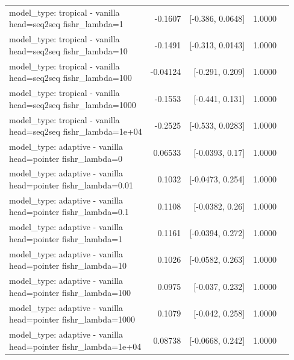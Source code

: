 \documentclass[10pt]{article}
\makeatletter
\newcommand{\stackcell}[1]{\begin{tabular}[t]{@{}l@{}}#1\end{tabular}}
\makeatother
\begin{document}
{\begin{longtable}{lrrrl}
\stackcell{model\_type: tropical - vanilla\\\footnotesize head=seq2seq fishr\_lambda=1 } & -0.1607 & [-0.386, 0.0648] & 1.0000 & \\
\stackcell{model\_type: tropical - vanilla\\\footnotesize head=seq2seq fishr\_lambda=10 } & -0.1491 & [-0.313, 0.0143] & 1.0000 & \\
\stackcell{model\_type: tropical - vanilla\\\footnotesize head=seq2seq fishr\_lambda=100 } & -0.04124 & [-0.291, 0.209] & 1.0000 & \\
\stackcell{model\_type: tropical - vanilla\\\footnotesize head=seq2seq fishr\_lambda=1000 } & -0.1553 & [-0.441, 0.131] & 1.0000 & \\
\stackcell{model\_type: tropical - vanilla\\\footnotesize head=seq2seq fishr\_lambda=1e+04 } & -0.2525 & [-0.533, 0.0283] & 1.0000 & \\
\stackcell{model\_type: adaptive - vanilla\\\footnotesize head=pointer fishr\_lambda=0 } & 0.06533 & [-0.0393, 0.17] & 1.0000 & \\
\stackcell{model\_type: adaptive - vanilla\\\footnotesize head=pointer fishr\_lambda=0.01 } & 0.1032 & [-0.0473, 0.254] & 1.0000 & \\
\stackcell{model\_type: adaptive - vanilla\\\footnotesize head=pointer fishr\_lambda=0.1 } & 0.1108 & [-0.0382, 0.26] & 1.0000 & \\
\stackcell{model\_type: adaptive - vanilla\\\footnotesize head=pointer fishr\_lambda=1 } & 0.1161 & [-0.0394, 0.272] & 1.0000 & \\
\stackcell{model\_type: adaptive - vanilla\\\footnotesize head=pointer fishr\_lambda=10 } & 0.1026 & [-0.0582, 0.263] & 1.0000 & \\
\stackcell{model\_type: adaptive - vanilla\\\footnotesize head=pointer fishr\_lambda=100 } & 0.0975 & [-0.037, 0.232] & 1.0000 & \\
\stackcell{model\_type: adaptive - vanilla\\\footnotesize head=pointer fishr\_lambda=1000 } & 0.1079 & [-0.042, 0.258] & 1.0000 & \\
\stackcell{model\_type: adaptive - vanilla\\\footnotesize head=pointer fishr\_lambda=1e+04 } & 0.08738 & [-0.0668, 0.242] & 1.0000 & \\

\end{longtable}}
\end{document}
